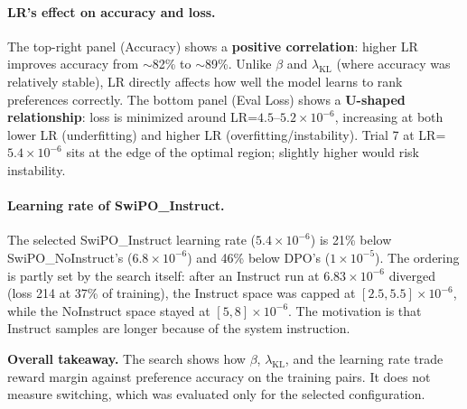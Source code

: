 \paragraph{LR's effect on accuracy and loss.}
The top-right panel (Accuracy) shows a \textbf{positive correlation}: higher LR improves accuracy from $\sim$82\% to $\sim$89\%.
Unlike $\beta$ and $\lambda_{\text{KL}}$ (where accuracy was relatively stable), LR directly affects how well the model learns to rank preferences correctly.
The bottom panel (Eval Loss) shows a \textbf{U-shaped relationship}: loss is minimized around LR=$4.5$--$5.2 \times 10^{-6}$, increasing at both lower LR (underfitting) and higher LR (overfitting/instability).
Trial 7 at LR=$5.4 \times 10^{-6}$ sits at the edge of the optimal region; slightly higher would risk instability.

\paragraph{Learning rate of SwiPO\_Instruct.}
The selected SwiPO\_Instruct learning rate ($5.4 \times 10^{-6}$) is 21\% below SwiPO\_NoInstruct's ($6.8 \times 10^{-6}$) and 46\% below DPO's ($1 \times 10^{-5}$). The ordering is partly set by the search itself: after an Instruct run at $6.83 \times 10^{-6}$ diverged (loss 214 at 37\% of training), the Instruct space was capped at $[2.5, 5.5] \times 10^{-6}$, while the NoInstruct space stayed at $[5, 8] \times 10^{-6}$. The motivation is that Instruct samples are longer because of the system instruction.

\vspace{-0.25em}
\noindent
\textbf{Overall takeaway.}
The search shows how $\beta$, $\lambda_{\text{KL}}$, and the learning rate trade reward margin against preference accuracy on the training pairs. It does not measure switching, which was evaluated only for the selected configuration.








